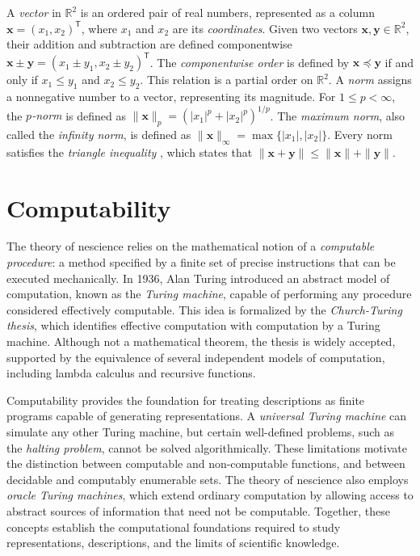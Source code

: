 A \emph{vector} in $\mathbb{R}^2$ is an ordered pair of real numbers, represented as a column $\mathbf{x} = (x_1,x_2)^{\mathsf{T}}$, where $x_1$ and $x_2$ are its \emph{coordinates}. Given two vectors $\mathbf{x},\mathbf{y} \in \mathbb{R}^2$, their addition and subtraction are defined componentwise $\mathbf{x} \pm \mathbf{y} = (x_1 \pm y_1, x_2 \pm y_2)^{\mathsf{T}}$. The \emph{componentwise order} is defined by $\mathbf{x} \preceq \mathbf{y}$ if and only if $x_1 \leq y_1$ and $x_2 \leq y_2$. This relation is a partial order on $\mathbb{R}^2$. A \emph{norm} assigns a nonnegative number to a vector, representing its magnitude. For $1 \leq p < \infty$, the \emph{$p$-norm}  is defined as $\|\mathbf{x}\|_p = \left(|x_1|^p + |x_2|^p\right)^{1/p}$. The \emph{maximum norm}, also called the \emph{infinity norm}, is defined as $\|\mathbf{x}\|_\infty = \max\{|x_1|,|x_2|\}$. Every norm satisfies the \emph{triangle inequality} , which states that $\|\mathbf{x}+\mathbf{y}\| \leq \|\mathbf{x}\|+\|\mathbf{y}\|$.

%
%

\section{Computability}
\label{sec:computability}

The theory of nescience relies on the mathematical notion of a \emph{computable procedure}: a method specified by a finite set of precise instructions that can be executed mechanically. In 1936, Alan Turing introduced an abstract model of computation, known as the \emph{Turing machine}, capable of performing any procedure considered effectively computable. This idea is formalized by the \emph{Church-Turing thesis}, which identifies effective computation with computation by a Turing machine. Although not a mathematical theorem, the thesis is widely accepted, supported by the equivalence of several independent models of computation, including lambda calculus and recursive functions.

Computability provides the foundation for treating descriptions as finite programs capable of generating representations. A \emph{universal Turing machine} can simulate any other Turing machine, but certain well-defined problems, such as the \emph{halting problem}, cannot be solved algorithmically. These limitations motivate the distinction between computable and non-computable functions, and between decidable and computably enumerable sets. The theory of nescience also employs \emph{oracle Turing machines}, which extend ordinary computation by allowing access to abstract sources of information that need not be computable. Together, these concepts establish the computational foundations required to study representations, descriptions, and the limits of scientific knowledge.

